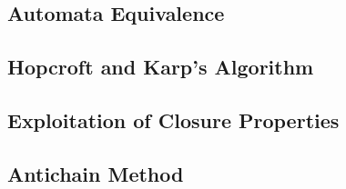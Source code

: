     \subsection{Automata Equivalence}

    \subsection{Hopcroft and Karp's Algorithm}

    \subsection{Exploitation of Closure Properties}

    \subsection{Antichain Method}
